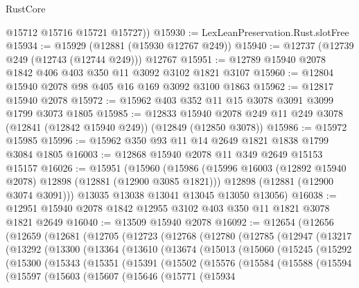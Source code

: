 \begin{lexlean}{RustCore}
\begin{coremodule}
        @15712
        @15716
        @15721
        @15727))
@15930 := LexLeanPreservation.Rust.slotFree
@15934 := @15929 (@12881 (@15930 @12767 @249))
@15940 := @12737 (@12739 @249 (@12743 (@12744 @249))) @12767
@15951 := @12789 @15940 @2078 @1842 @406 @403 @350 @11 @3092 @3102 @1821 @3107
@15960 := @12804 @15940 @2078 @98 @405 @16 @169 @3092 @3100 @1863
@15962 := @12817 @15940 @2078
@15972 := @15962 @403 @352 @11 @15 @3078 @3091 @3099 @1799 @3073 @1805
@15985 := @12833
    @15940
    @2078
    @249
    @11
    @249
    @3078
    (@12841 (@12842 @15940 @249))
    (@12849 (@12850 @3078))
@15986 := @15972 @15985
@15996 := @15962 @350 @93 @11 @14 @2649 @1821 @1838 @1799 @3084 @1805
@16003 := @12868 @15940 @2078 @11 @349 @2649 @15153 @15157
@16026 := @15951
    (@15960
      (@15986
        (@15996 @16003 (@12892 @15940 @2078) @12898 (@12881 (@12900 @3085 @1821)))
        @12898
        (@12881 (@12900 @3074 @3091)))
      @13035
      @13038
      @13041
      @13045
      @13050
      @13056)
@16038 := @12951 @15940 @2078 @1842 @12955 @3102 @403 @350 @11 @1821 @3078 @1821 @2649
@16040 := @13509 @15940 @2078
@16092 := @12654
    (@12656
      (@12659
        (@12681
          (@12705
            (@12723
              (@12768
                (@12780
                  (@12785
                    (@12947
                      (@13217
                        (@13292
                          (@13300
                            (@13364
                              (@13610
                                (@13674
                                  (@15013
                                    (@15060
                                      (@15245
                                        (@15292
                                          (@15300
                                            (@15343
                                              (@15351
                                                (@15391
                                                  (@15502
                                                    (@15576
                                                      (@15584
                                                        (@15588
                                                          (@15594
                                                            (@15597
                                                              (@15603
                                                                (@15607
                                                                  (@15646
                                                                    (@15771
                                                                      (@15934

\end{coremodule}
\end{lexlean}
